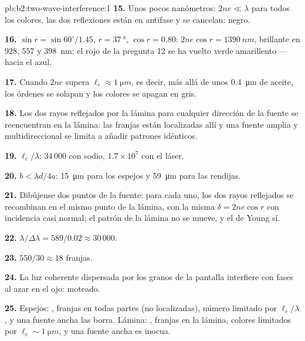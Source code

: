 \begin{solution}{pb:b2:two-wave-interference:1}
\textbf{15.} Unos pocos nanómetros: $2ne \ll \lambda$ para todos los colores, las dos
reflexiones están en antifase y se cancelan: negro.

\textbf{16.} $\sin r = \sin60^\circ/1.45$, $r = \qty{37}{\degree}$, $\cos r = 0.80$: $2ne\cos r
= \qty{1390}{nm}$, brillante en $928$, $557$ y \qty{398}{nm}: el rojo de la pregunta 12 se ha
vuelto verde amarillento --- hacia el azul.

\textbf{17.} Cuando $2ne$ supera $\ell_c \approx \qty{1}{\micro m}$, es decir, más allá de unos
\qty{0.4}{\micro m} de aceite, los órdenes se solapan y los colores se apagan en gris.

\textbf{18.} Los dos rayos reflejados por la lámina para cualquier dirección
de la fuente se reencuentran en la lámina: las franjas están localizadas allí y
una fuente amplia y multidireccional se limita a añadir patrones idénticos.

\textbf{19.} $\ell_c/\lambda$: $34\,000$ con sodio, $1.7 \times 10^7$ con el láser.

\textbf{20.} $b < \lambda d/4a$: \qty{15}{\micro m} para los espejos y \qty{59}{\micro m} para
las rendijas.

\textbf{21.} Dibújense dos puntos de la fuente: para cada uno, los dos rayos reflejados
se recombinan en el mismo punto de la lámina, con la misma $\delta = 2ne\cos r$
con incidencia casi normal; el patrón de la lámina no se mueve, y el de Young sí.

\textbf{22.} $\lambda/\Delta\lambda = 589/0.02 \approx 30\,000$.

\textbf{23.} $550/30 \approx 18$ franjas.

\textbf{24.} La luz coherente dispersada por los granos de la pantalla interfiere
con fases al azar en el ojo: moteado.

\textbf{25.} Espejos: , franjas en todas partes
(no localizadas), número limitado por $\ell_c/\lambda$, y una fuente ancha las
borra. Lámina: , franjas en la lámina, colores
limitados por $\ell_c \sim \qty{1}{\micro m}$, y una fuente ancha es inocua.
\end{solution}
